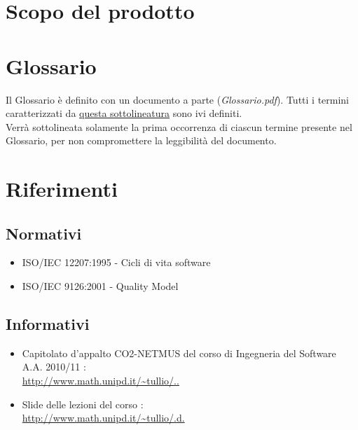 
\section{Scopo del prodotto}

\section{Glossario}
Il Glossario \`e definito con un documento a parte (\emph{Glossario.pdf}). Tutti
i termini caratterizzati da \underline{questa sottolineatura} sono ivi
definiti.\\ Verr\`a sottolineata solamente la prima occorrenza di ciascun
termine presente nel Glossario, per non compromettere la leggibilit\`a del documento.

\section{Riferimenti}

\subsection{Normativi} %
\begin{itemize}
  \item ISO/IEC 12207:1995 - Cicli di vita software
  \item ISO/IEC 9126:2001 - Quality Model
\end{itemize}

\subsection{Informativi}
\begin{itemize}
  \item Capitolato d'appalto CO2-NETMUS del corso di Ingegneria del Software
  A.A. 2010/11 :\\
  \url{http://www.math.unipd.it/~tullio/..}
  \item Slide delle lezioni del corso :\\
  \url{http://www.math.unipd.it/~tullio/.d.}
\end{itemize}
